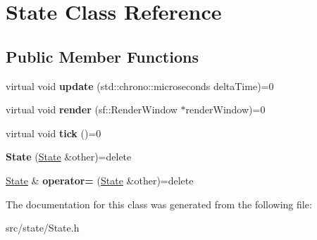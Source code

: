 \hypertarget{classState}{\section{State Class Reference}
\label{classState}
}
\subsection*{Public Member Functions}
\begin{DoxyCompactItemize}
\item 
\hypertarget{classState_af2121f8eb52144b7a789214f15e3601a}{virtual void {\bfseries update} (std\-::chrono\-::microseconds delta\-Time)=0}\label{classState_af2121f8eb52144b7a789214f15e3601a}

\item 
\hypertarget{classState_abea822ddf8d4a55439a0040eba979afb}{virtual void {\bfseries render} (sf\-::\-Render\-Window $\ast$render\-Window)=0}\label{classState_abea822ddf8d4a55439a0040eba979afb}

\item 
\hypertarget{classState_a1cdec36e9ffad91ba7af560770601017}{virtual void {\bfseries tick} ()=0}\label{classState_a1cdec36e9ffad91ba7af560770601017}

\item 
\hypertarget{classState_a8fba10b9995ce898339f3b0d39234788}{{\bfseries State} (\hyperlink{classState}{State} \&other)=delete}\label{classState_a8fba10b9995ce898339f3b0d39234788}

\item 
\hypertarget{classState_a7ac6cc4de6723746df3dfb183b8eb84f}{\hyperlink{classState}{State} \& {\bfseries operator=} (\hyperlink{classState}{State} \&other)=delete}\label{classState_a7ac6cc4de6723746df3dfb183b8eb84f}

\end{DoxyCompactItemize}


The documentation for this class was generated from the following file\-:\begin{DoxyCompactItemize}
\item 
src/state/State.\-h\end{DoxyCompactItemize}
